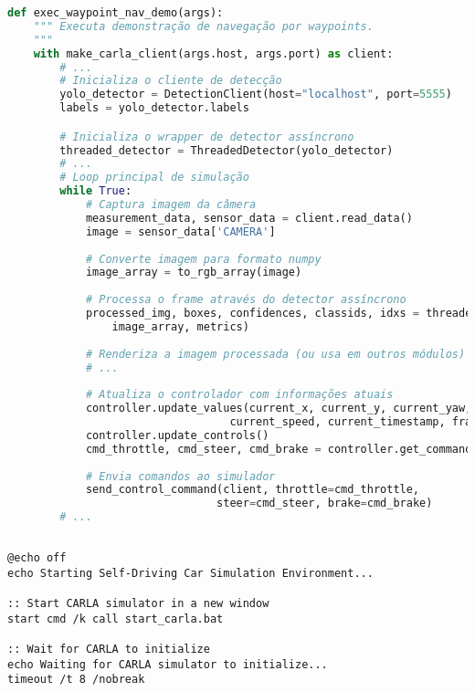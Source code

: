 \documentclass[
	12pt,				%
	oneside, %
	a4paper,			%
	english,			%
	french,				%
	spanish,			%
	brazil				%
	]{abntex2}
\begin{document}
\begin{apendicesenv}
\begin{lstlisting}[language=Python, caption=Integração do módulo de percepção com sistema completo., label=lst:main_integration]
def exec_waypoint_nav_demo(args):
    """ Executa demonstração de navegação por waypoints.
    """
    with make_carla_client(args.host, args.port) as client:
        # ...
        # Inicializa o cliente de detecção
        yolo_detector = DetectionClient(host="localhost", port=5555)
        labels = yolo_detector.labels

        # Inicializa o wrapper de detector assíncrono
        threaded_detector = ThreadedDetector(yolo_detector)
        # ...        
        # Loop principal de simulação
        while True:
            # Captura imagem da câmera
            measurement_data, sensor_data = client.read_data()
            image = sensor_data['CAMERA']
            
            # Converte imagem para formato numpy
            image_array = to_rgb_array(image)
            
            # Processa o frame através do detector assíncrono
            processed_img, boxes, confidences, classids, idxs = threaded_detector.process_frame(
                image_array, metrics)
                
            # Renderiza a imagem processada (ou usa em outros módulos)
            # ...
            
            # Atualiza o controlador com informações atuais
            controller.update_values(current_x, current_y, current_yaw,
                                  current_speed, current_timestamp, frame)
            controller.update_controls()
            cmd_throttle, cmd_steer, cmd_brake = controller.get_commands()
            
            # Envia comandos ao simulador
            send_control_command(client, throttle=cmd_throttle,
                                steer=cmd_steer, brake=cmd_brake)
        # ...
                               
\end{lstlisting}

\begin{lstlisting}[style=cmdstyle, caption={\textit{Script} de inicialização completa do sistema.}, label={lst:start_all}]
@echo off
echo Starting Self-Driving Car Simulation Environment...

:: Start CARLA simulator in a new window
start cmd /k call start_carla.bat

:: Wait for CARLA to initialize
echo Waiting for CARLA simulator to initialize...
timeout /t 8 /nobreak


\end{lstlisting}
\end{apendicesenv}
\end{document}
